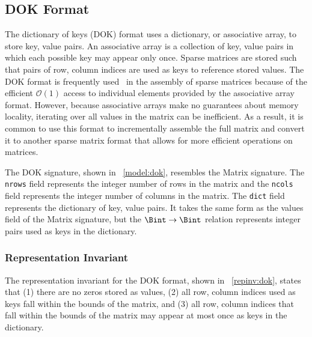 \subsection{DOK Format}

The dictionary of keys (DOK) format uses a dictionary, or associative array, to store key, value pairs.  An associative array is a collection of key, value pairs in which each possible key may appear only once.  Sparse matrices are stored such that pairs of row, column indices are used as keys to reference stored values.  The DOK format is frequently used~\cite{scipy, eigenweb2010} in the assembly of sparse matrices because of the efficient \(\mathcal{O}(1)\) access to individual elements provided by the associative array format.  However, because associative arrays make no guarantees about memory locality, iterating over all values in the matrix can be inefficient.  As a result, it is common to use this format to incrementally assemble the full matrix and convert it to another sparse matrix format that allows for more efficient operations on matrices.

The DOK signature, shown in \figurename~\ref{model:dok}, resembles the Matrix signature.  The \texttt{nrows} field represents the integer number of rows in the matrix and the \texttt{ncols} field represents the integer number of columns in the matrix.  The \texttt{dict} field represents the dictionary of key, value pairs.  It takes the same form as the values field of the Matrix signature, but the \(\Bint \to \Bint\) relation represents integer pairs used as keys in the dictionary.

% 

\subsubsection{Representation Invariant}

The representation invariant for the DOK format, shown in \figurename~\ref{repinv:dok}, states that (1) there are no zeros stored as values, (2) all row, column indices used as keys fall within the bounds of the matrix, and (3) all row, column indices that fall within the bounds of the matrix may appear at most once as keys in the dictionary.

% 

